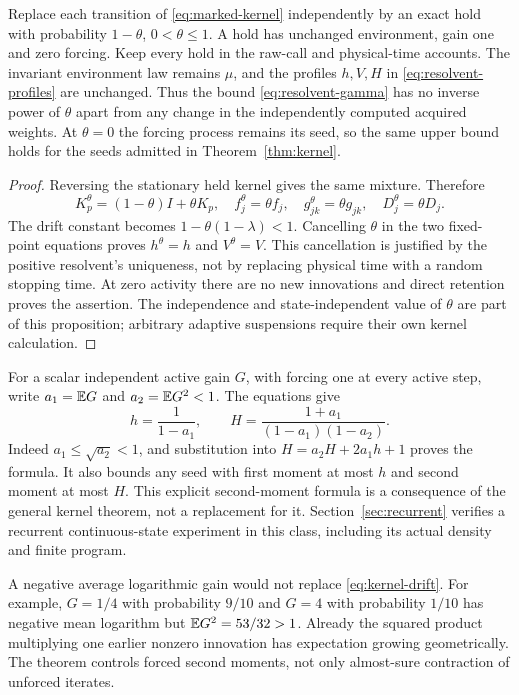\begin{proposition}\label{prop:suspension}
Replace each transition of \eqref{eq:marked-kernel} independently by an exact hold with probability $1-\theta$, $0<\theta\le1$. A hold has unchanged environment, gain one and zero forcing. Keep every hold in the raw-call and physical-time accounts. The invariant environment law remains $\mu$, and the profiles $h,V,H$ in \eqref{eq:resolvent-profiles} are unchanged. Thus the bound \eqref{eq:resolvent-gamma} has no inverse power of $\theta$ apart from any change in the independently computed acquired weights. At $\theta=0$ the forcing process remains its seed, so the same upper bound holds for the seeds admitted in Theorem~\ref{thm:kernel}.
\end{proposition}
\begin{proof}
Reversing the stationary held kernel gives the same mixture. Therefore
\[
 K_p^\theta=(1-\theta)I+\theta K_p,
 \quad f_j^\theta=\theta f_j,\quad
 g_{jk}^\theta=\theta g_{jk},\quad D_j^\theta=\theta D_j.
\]
The drift constant becomes $1-\theta(1-\lambda)<1$. Cancelling $\theta$ in the two fixed-point equations proves $h^\theta=h$ and $V^\theta=V$. This cancellation is justified by the positive resolvent's uniqueness, not by replacing physical time with a random stopping time. At zero activity there are no new innovations and direct retention proves the assertion. The independence and state-independent value of $\theta$ are part of this proposition; arbitrary adaptive suspensions require their own kernel calculation.
\end{proof}

For a scalar independent active gain $G$, with forcing one at every active step, write $a_1=\mathbb E G$ and $a_2=\mathbb E G^2<1$. The equations give
\begin{equation}\label{eq:scalar-resolvent}
 h=\frac1{1-a_1},\qquad H=\frac{1+a_1}{(1-a_1)(1-a_2)}.
\end{equation}
Indeed $a_1\le\sqrt{a_2}<1$, and substitution into $H=a_2H+2a_1h+1$ proves the formula. It also bounds any seed with first moment at most $h$ and second moment at most $H$. This explicit second-moment formula is a consequence of the general kernel theorem, not a replacement for it. Section~\ref{sec:recurrent} verifies a recurrent continuous-state experiment in this class, including its actual density and finite program.

A negative average logarithmic gain would not replace \eqref{eq:kernel-drift}. For example, $G=1/4$ with probability $9/10$ and $G=4$ with probability $1/10$ has negative mean logarithm but $\mathbb E G^2=53/32>1$. Already the squared product multiplying one earlier nonzero innovation has expectation growing geometrically. The theorem controls forced second moments, not only almost-sure contraction of unforced iterates.
